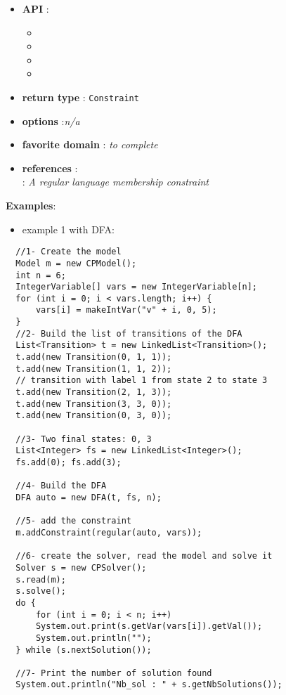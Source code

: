 \begin{itemize}
	\item \textbf{API} :
	\begin{itemize}
		\item {}
		\item {}
		\item {}
		\item {}
	\end{itemize}
	\item \textbf{return type} : \texttt{Constraint}
	\item \textbf{options} :\emph{n/a}
	\item \textbf{favorite domain} : \emph{to complete}
	\item \textbf{references} :\\
       \cite{PesantCP04}: \emph{A regular language membership constraint}
\end{itemize}

\textbf{Examples}:
\begin{itemize}
	\item example 1 with DFA:
\end{itemize}

\begin{lstlisting}
  //1- Create the model
  Model m = new CPModel();
  int n = 6;
  IntegerVariable[] vars = new IntegerVariable[n];
  for (int i = 0; i < vars.length; i++) {
      vars[i] = makeIntVar("v" + i, 0, 5);
  }
  //2- Build the list of transitions of the DFA
  List<Transition> t = new LinkedList<Transition>();
  t.add(new Transition(0, 1, 1));
  t.add(new Transition(1, 1, 2));
  // transition with label 1 from state 2 to state 3 
  t.add(new Transition(2, 1, 3));
  t.add(new Transition(3, 3, 0));
  t.add(new Transition(0, 3, 0));
  
  //3- Two final states: 0, 3
  List<Integer> fs = new LinkedList<Integer>();
  fs.add(0); fs.add(3);
            
  //4- Build the DFA
  DFA auto = new DFA(t, fs, n);
  
  //5- add the constraint
  m.addConstraint(regular(auto, vars));
  
  //6- create the solver, read the model and solve it
  Solver s = new CPSolver();
  s.read(m);
  s.solve();
  do {
      for (int i = 0; i < n; i++)
      System.out.print(s.getVar(vars[i]).getVal());
      System.out.println("");
  } while (s.nextSolution());
  
  //7- Print the number of solution found
  System.out.println("Nb_sol : " + s.getNbSolutions());
\end{lstlisting}

